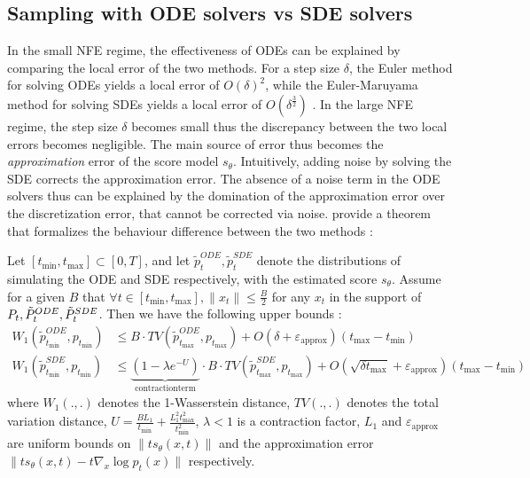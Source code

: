 \subsection{Sampling with ODE solvers vs SDE solvers}
In the small NFE regime, the effectiveness of ODEs can be explained by comparing the local error of the two methods. For a step size $\delta$, the Euler method for solving ODEs yields a local error of $O(\delta)^{2}$, while the Euler-Maruyama method for solving SDEs yields a local error of $O(\delta^{\frac{3}{2}})$ \citep{Dalalyan_2019}. 
In the large NFE regime, the step size $\delta$ becomes small thus the discrepancy between the two local errors becomes negligible. The main source of error thus becomes the \textit{approximation} error of the score model $s_{\theta}$. Intuitively, adding noise by solving the SDE corrects the approximation error. The absence of a noise term in the ODE solvers thus can be explained by the domination of the approximation error over the discretization error, that cannot be corrected via noise.
\citep{xu_restart_2023} provide a theorem that formalizes the behaviour difference between the two methods : 
\begin{theorem}\citep{xu_restart_2023}
Let $[t_{\min},t_{\max}] \subset [0,T] $, and let $\tilde{p}_{t}^{ODE}, \tilde{p}_{t}^{SDE}$ denote the distributions of simulating the ODE and SDE respectively, with the estimated score $s_{\theta}$. Assume for a given $B$
that $\forall t \in [t_{\min},t_{\max}], \|x_{t}\| \leq \frac{B}{2}$ for any $x_{t}$ in the support of $P_{t},\Tilde{P}_{t}^{ODE},\Tilde{P}_{t}^{SDE}$. Then we have the following upper bounds :
\begin{align}

    W_{1}(\tilde{p}_{t_{\min}}^{ODE},p_{t_{\min}}) &\leq B \cdot TV(\tilde{p}_{t_{\max}}^{ODE},p_{t_{\max}}) + O(\delta + \varepsilon_{\mathrm{approx}})(t_{\max}-t_{\min}) \\
    W_{1}(\tilde{p}_{t_{\min}}^{SDE},p_{t_{\min}}) &\leq \underbrace{(1-\lambda e^{-U})}_{\mathrm{contraction term}}\cdot B \cdot TV(\tilde{p}_{t_{\max}}^{SDE},p_{t_{\max}}) + O(\sqrt{\delta t_{\max}} + \varepsilon_{\mathrm{approx}})(t_{\max}-t_{\min})

\end{align}
where $W_{1}(.,.)$ denotes the 1-Wasserstein distance, $TV(.,.)$ denotes the total variation distance, $U = \frac{BL_{1}}{t_{\min}} + \frac{L_{1}^{2}t_{\max}^{2}}{t_{\min}^{2}}$, $\lambda < 1$ is a contraction factor, $L_{1}$ and $\varepsilon_{\mathrm{approx}}$ are uniform bounds on $\|ts_{\theta}(x,t)\|$ and the approximation error $\|ts_{\theta}(x,t) - t\nabla_{x} \log p_{t}(x)\|$ respectively.
\end{theorem}
